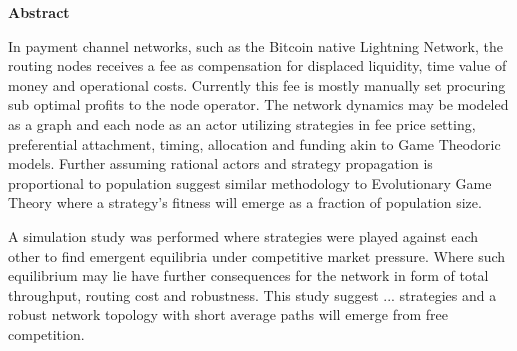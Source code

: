 \centering \textbf{Abstract}

In payment channel networks, such as the Bitcoin native Lightning Network, the routing
nodes receives a fee as compensation for displaced liquidity, time value of money and operational
costs. Currently this fee is mostly manually set procuring sub optimal profits to
the node operator. The network dynamics may be modeled as a graph and each node as an actor
utilizing strategies in fee price setting, preferential attachment, timing, allocation and
funding akin to Game Theodoric models. Further assuming rational actors and strategy propagation is  
proportional to population suggest similar methodology to Evolutionary Game Theory where
a strategy's fitness will emerge as a fraction of population size.

A simulation study was performed where strategies were played against each other to find emergent equilibria under
competitive market pressure. Where such equilibrium may lie have further consequences for the network in form of 
total throughput, routing cost and robustness. 
This study suggest ... strategies and a robust network topology with short 
average paths will emerge from free competition.
